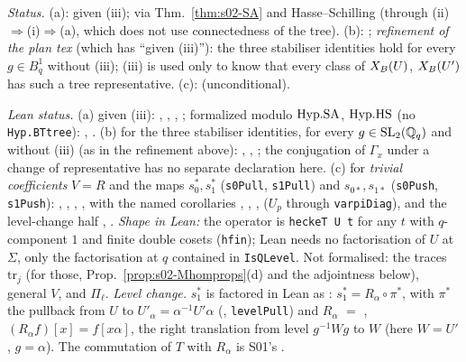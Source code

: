 \begin{sloppypar}\noindent\emph{Status.} (a): \stproved{} given (iii); \stpmc{} via Thm.~\ref{thm:s02-SA} and Hasse--Schilling (through
(ii)$\Rightarrow$(i)$\Rightarrow$(a), which does not use connectedness of the tree). (b): \stproved; \emph{refinement of the plan tex} (which has ``given (iii)''): the three stabiliser identities
hold for every $g\in B^1_q$ without (iii); (iii) is used only to know that every class of $X_B(U)$, $X_B(U')$ has such a tree
representative. (c): \stproved{} (unconditional).

\emph{Lean status.} (a) \stformal{} given (iii): , ,
, ; formalized modulo $\mathrm{Hyp.SA}$, $\mathrm{Hyp.HS}$ (no
\texttt{Hyp.BTtree}): , .
(b) \stformal{} for the three stabiliser identities, for every $g\in\mathrm{SL}_2(\mathbb{Q}_q)$ and without (iii) (as in the refinement above):
, , ;
the conjugation of $\Gamma_x$ under a change of representative has no separate declaration here.
(c) \stformal{} for \emph{trivial coefficients} $V=R$ and the maps $s_0^*,s_1^*$ (\texttt{s0Pull}, \texttt{s1Pull}) and $s_{0*},s_{1*}$
(\texttt{s0Push}, \texttt{s1Push}): , ,
, , with the named corollaries
, , ,
 ($U_p$ through \texttt{varpiDiag}), and the level-change half
, . \emph{Shape in Lean:} the
operator is \texttt{heckeT U t} for any $t$ with $q$-component $1$ and finite double cosets (\texttt{hfin}); Lean needs no factorisation
of $U$ at $\Sigma$, only the factorisation at $q$ contained in \texttt{IsQLevel}. Not formalised: the traces $\mathrm{tr}_j$ (for
those, Prop.~\ref{prop:s02-Mhomprops}(d) and the adjointness below), general $V$, and $\Pi_\ell$.
\emph{Level change.} $s_1^*$ is factored in Lean as : $s_1^*=R_\alpha\circ\pi^*$, with $\pi^*$ the
pullback from $U$ to $U'_\alpha=\alpha^{-1}U'\alpha$ (, \texttt{levelPull}) and
$R_\alpha$ $=$ , $(R_\alpha f)[x]=f[x\alpha]$, the right translation from level
$g^{-1}Wg$ to $W$ (here $W=U'$, $g=\alpha$). The commutation of $T$ with $R_\alpha$ is S01's
.\end{sloppypar}

